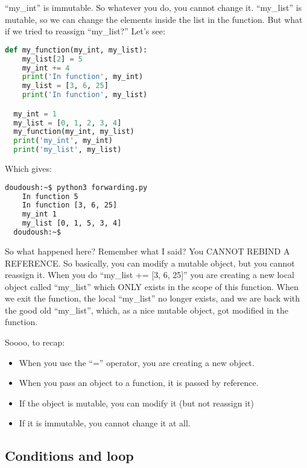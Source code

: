 ``my\_int'' is immutable. So whatever you do, you cannot change it. ``my\_list'' is mutable,
so we can change the elements inside the list in the function. But what if we tried to
reassign ``my\_list?'' Let's see:

\begin{lstlisting}[language=python]
  def my_function(my_int, my_list):
    my_list[2] = 5
    my_int += 4
    print('In function', my_int)
    my_list = [3, 6, 25]
    print('In function', my_list)

  my_int = 1
  my_list = [0, 1, 2, 3, 4]
  my_function(my_int, my_list)
  print('my_int', my_int)
  print('my_list', my_list)
\end{lstlisting}

Which gives:

\begin{lstlisting}[language=bash]
  doudoush:~$ python3 forwarding.py
    In function 5
    In function [3, 6, 25]
    my_int 1
    my_list [0, 1, 5, 3, 4]
  doudoush:~$
\end{lstlisting}

So what happened here? Remember what I said? You CANNOT REBIND A REFERENCE.
So basically, you can modify a mutable object, but you cannot reassign it.
When you do ``my\_list += [3, 6, 25]'' you are creating a new local object called ``my\_list''
which ONLY exists in the scope of this function. When we exit the function, the local ``my\_list''
no longer exists, and we are back with the good old ``my\_list'', which, as a nice mutable
object, got modified in the function.

\vspace{5mm}

Soooo, to recap:

\begin{itemize}
\item When you use the ``='' operator, you are creating a new object.
\item When you pass an object to a function, it is passed by reference.
\item If the object is mutable, you can modify it (but not reassign it)
\item If it is immutable, you cannot change it at all.
\end{itemize}

\subsection{Conditions and loop}

